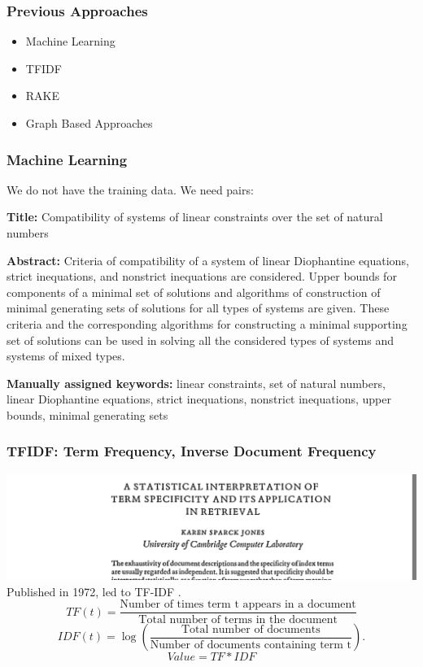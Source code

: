\documentclass{beamer}
\begin{document}
\begin{frame}
\frametitle{Previous Approaches}
\begin{itemize}
\item Machine Learning
\vspace{0.5in}
\item TFIDF
\vspace{0.5in}
\item RAKE
\vspace{0.5in}
\item Graph Based Approaches
\end{itemize}
\end{frame}

\begin{frame}
\frametitle{Machine Learning}
We do not have the training data. We need pairs:

\vspace{0.2in}
\textbf{Title:} Compatibility of systems of linear constraints over the set of natural numbers

\textbf{Abstract:} Criteria of compatibility of a system of linear Diophantine equations, strict inequations, and nonstrict inequations are considered. Upper bounds for components of a minimal set of solutions and algorithms of construction of minimal generating sets of solutions for all types of systems are given. These criteria and the corresponding algorithms for constructing a minimal supporting set of solutions can be used in solving all the considered types of systems and systems of mixed types.


\textbf{Manually assigned keywords:}
linear constraints, set of natural numbers, linear Diophantine equations, strict inequations, nonstrict inequations, upper bounds, minimal generating sets

\end{frame}

\begin{frame}
\frametitle{TFIDF: Term Frequency, Inverse Document Frequency}
\includegraphics[width= \textwidth]{img/tfidf}
\vspace{0.5cm}
Published in 1972, led to TF-IDF .
\vspace{0.5cm}
\[
TF(t) = \frac{\text{Number of times term t appears in a document}}{\text{Total number of terms in the document}}
\]
\[
IDF(t) = \log \left( \frac{\text{Total number of documents}}{{\text{Number of documents containing term t}}} \right).
\]
\[
Value = TF * IDF
\]
\end{frame}
\end{document}

